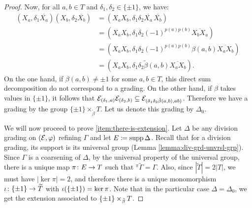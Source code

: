 \begin{proof}
    Now, for all $a, b \in T$ and $\delta_1, \delta_2 \in \{ \pm 1 \}$, we have:
    \begin{align*}
        (X_{a}, \delta_1 \overline{X_{a}})(X_{b}, \delta_2 \overline{X_{b}}) &= (X_{a} X_{b}, \delta_1 \delta_2 \overline{X_{a}} \,\overline{X_{b}}) \\
        &= (X_{a} X_{b}, \delta_1 \delta_2 (-1)^{p(a)p(b)} \overline{X_{b}X_{a}})\\ 
        &=(X_{a} X_{b}, \delta_1 \delta_2 (-1)^{p(a)p(b)} \beta(a, b) \overline{X_{a} X_{b}})\\
        &= (X_{a} X_{b}, \delta_1 \delta_2 \tilde\beta (a,b) \overline{X_{a} X_{b}}).
    \end{align*}
    On the one hand, if $\beta(a, b) \neq \pm 1$ for some $a,b \in T$, this direct sum decomposition do not correspond to a grading. 
    On the other hand, if $\beta$ takes values in $\{ \pm 1 \}$, it follows that $\mathcal E_{(\delta_1, a)} \mathcal E_{(\delta_2, b)} \subseteq \mathcal E_{(\delta_1 \delta_2 \tilde\beta (a,b), ab)}$. 
    Therefore we have a grading by the group $\{ \pm 1\} \times_{\tilde\beta} T$. 
    Let us denote this grading by $\Delta_0$. 
    
    We will now proceed to prove \eqref{item:there-is-extension}. 
    Let $\Delta$ be any division grading on $(\mathcal E, \varphi)$ refining $\Gamma$ and let $E \coloneqq \operatorname{supp} \Delta$. 
    Recall that for a division grading, its support is its universal group (Lemma \ref{lemma:div-grd-unvrsl-grp}). 
    Since $\Gamma$ is a coarsening of $\Delta$, by the universal property of the universal group, there is a unique map $\pi\colon E\to T$ such that ${}^{\pi}\widetilde \Gamma = \Gamma$. 
    Also, since $|\widetilde T| = 2 |T|$, we must have $|\ker \pi| = 2$, and therefore there is a unique monomorphism $\iota\colon \{ \pm 1 \} \to \widetilde T$ with $\iota(\{ \pm 1 \}) = \ker \pi$. 
    Note that in the particular case $\Delta = \Delta_0$, we get the extension associated to $\{ \pm 1 \} \times_{\tilde\beta} T$.
    

\end{proof}
